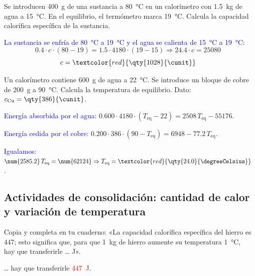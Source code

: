 \begin{exercise}
    Se introducen \qty{400}{\gram} de una sustancia a \qty{80}{\degreeCelsius} en un calorímetro con \qty{1.5}{\kg} de agua a \qty{15}{\degreeCelsius}. En el equilibrio, el termómetro marca \qty{19}{\degreeCelsius}. Calcula la capacidad calorífica específica de la sustancia.
    \begin{solu}
        \textcolor{blue}{La sustancia se enfría de \qty{80}{\degreeCelsius} a \qty{19}{\degreeCelsius} y el agua se calienta de \qty{15}{\degreeCelsius} a \qty{19}{\degreeCelsius}:}
        \[ \num{0.4} \cdot c \cdot (80 - 19) = \num{1.5} \cdot 4180 \cdot (19 - 15) \Rightarrow \num{24.4} \cdot c = \num{25080} \]
        \[ c = \textcolor{red}{\qty{1028}{\cunit}} \]
    \end{solu}
\end{exercise}

\begin{exercise}
    Un calorímetro contiene \qty{600}{\gram} de agua a \qty{22}{\degreeCelsius}. Se introduce un bloque de cobre de \qty{200}{\gram} a \qty{90}{\degreeCelsius}. Calcula la temperatura de equilibrio. Dato: \(c_{\text{Cu}} = \qty{386}{\cunit}\).
    \begin{solu}
        \textcolor{blue}{Energía absorbida por el agua:} \(\num{0.600} \cdot 4180 \cdot (T_{\text{eq}} - 22) = 2508\,T_{\text{eq}} - \num{55176}\).

        \textcolor{blue}{Energía cedida por el cobre:} \(\num{0.200} \cdot 386 \cdot (90 - T_{\text{eq}}) = 6948 - \num{77.2}\,T_{\text{eq}}\).

        \textcolor{blue}{Igualamos:} \(\num{2585.2}\,T_{\text{eq}} = \num{62124} \Rightarrow T_{\text{eq}} = \textcolor{red}{\qty{24.0}{\degreeCelsius}}\).
    \end{solu}
\end{exercise}

\subsection*{Actividades de consolidación: cantidad de calor y variación de temperatura}

\begin{exercise}
    Copia y completa en tu cuaderno: «La capacidad calorífica específica del hierro es \qty{447}{\cunit}; esto significa que, para que \qty{1}{\kg} de hierro aumente su temperatura \qty{1}{\degreeCelsius}, hay que transferirle \ldots{} J».
    \begin{solu}
        \ldots{} hay que transferirle \textcolor{red}{\qty{447}{\joule}}.
    \end{solu}
\end{exercise}

